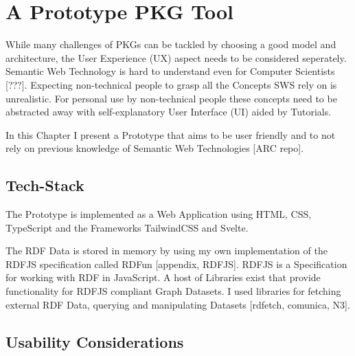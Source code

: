 \chapter{A Prototype PKG Tool} \label{ch:prototype}

While many challenges of PKGs can be tackled by choosing a good model and architecture, the User Experience (UX) aspect needs to be considered seperately. Semantic Web Technology is hard to understand even for Computer Scientists [???]. Expecting non-technical people to grasp all the Concepts SWS rely on is unrealistic. For personal use by non-technical people these concepts need to be abstracted away with self-explanatory User Interface (UI) aided by Tutorials. 

In this Chapter I present a Prototype that aims to be user friendly and to not rely on previous knowledge of Semantic Web Technologies [ARC repo].

\section{Tech-Stack}

The Prototype is implemented as a Web Application using HTML, CSS, TypeScript and the Frameworks TailwindCSS and Svelte. 

The RDF Data is stored in memory by using my own implementation of the RDFJS specification called RDFun  [appendix, RDFJS]. RDFJS is a Specification for working with RDF in JavaScript. A host of Libraries exist that provide functionality for RDFJS compliant Graph Datasets. I used libraries for  fetching external RDF Data, querying and manipulating Datasets [rdfetch, comunica, N3].

\section{Usability Considerations}

